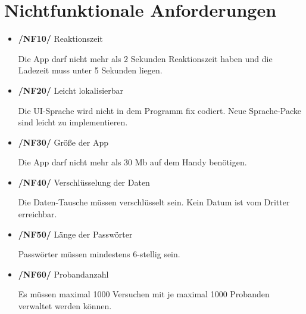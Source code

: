 \documentclass[a4paper]{scrreprt}
\begin{document}
   \chapter{Nichtfunktionale Anforderungen}
        \begin{itemize}
            \item \textbf{/NF10/} Reaktionszeit
                \par Die App darf nicht mehr als 2 Sekunden Reaktionszeit haben und die Ladezeit muss unter 5 Sekunden liegen.

            \item \textbf{/NF20/} Leicht lokalisierbar
                \par Die UI-Sprache wird nicht in dem Programm fix codiert. Neue Sprache-Packe sind leicht zu implementieren.

            \item \textbf{/NF30/} Größe der App
                \par Die App darf nicht mehr als 30 Mb auf dem Handy benötigen.

            \item \textbf{/NF40/} Verschlüsselung der Daten
                \par Die Daten-Tausche müssen verschlüsselt sein. Kein Datum ist vom Dritter erreichbar.
                
            \item \textbf{/NF50/} Länge der Passwörter
                \par Passwörter müssen mindestens 6-stellig sein.
                
            \item \textbf{/NF60/} Probandanzahl
            \par Es müssen maximal 1000 Versuchen mit je maximal 1000 Probanden verwaltet werden können.
        \end{itemize}

\end{document}
